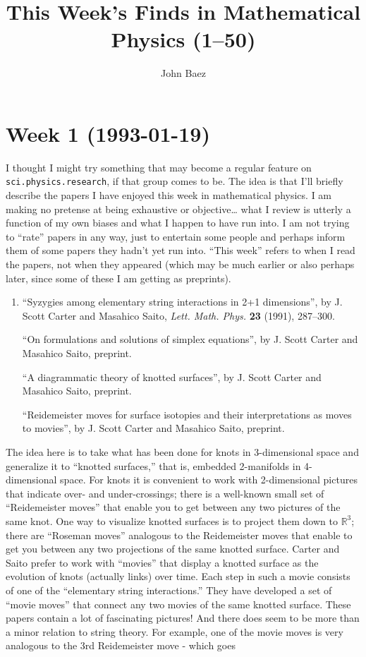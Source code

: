 \documentclass{article}
\title{This Week's Finds in Mathematical Physics (1--50)}
\author{John Baez}
\date{}
\begin{document}
\maketitle
\tableofcontents

\hypertarget{week-1-1993-01-19}{%
\section{Week 1 (1993-01-19)}\label{week-1-1993-01-19}}

I thought I might try something that may become a regular feature on
\texttt{sci.physics.research}, if that group comes to be. The idea is
that I'll briefly describe the papers I have enjoyed this week in
mathematical physics. I am making no pretense at being exhaustive or
objective\ldots{} what I review is utterly a function of my own biases
and what I happen to have run into. I am not trying to ``rate'' papers
in any way, just to entertain some people and perhaps inform them of
some papers they hadn't yet run into. ``This week'' refers to when I
read the papers, not when they appeared (which may be much earlier or
also perhaps later, since some of these I am getting as preprints).

\begin{enumerate}
\def\labelenumi{\arabic{enumi})}
\item
  ``Syzygies among elementary string interactions in 2+1 dimensions'',
  by J. Scott Carter and Masahico Saito, \emph{Lett. Math. Phys.}
  \textbf{23} (1991), 287--300.

  ``On formulations and solutions of simplex equations'', by J. Scott
  Carter and Masahico Saito, preprint.

  ``A diagrammatic theory of knotted surfaces'', by J. Scott Carter and
  Masahico Saito, preprint.

  ``Reidemeister moves for surface isotopies and their interpretations
  as moves to movies'', by J. Scott Carter and Masahico Saito, preprint.
\end{enumerate}

The idea here is to take what has been done for knots in 3-dimensional
space and generalize it to ``knotted surfaces,'' that is, embedded
2-manifolds in 4-dimensional space. For knots it is convenient to work
with 2-dimensional pictures that indicate over- and under-crossings;
there is a well-known small set of ``Reidemeister moves'' that enable
you to get between any two pictures of the same knot. One way to
visualize knotted surfaces is to project them down to \(\mathbb{R}^3\);
there are ``Roseman moves'' analogous to the Reidemeister moves that
enable to get you between any two projections of the same knotted
surface. Carter and Saito prefer to work with ``movies'' that display a
knotted surface as the evolution of knots (actually links) over time.
Each step in such a movie consists of one of the ``elementary string
interactions.'' They have developed a set of ``movie moves'' that
connect any two movies of the same knotted surface. These papers contain
a lot of fascinating pictures! And there does seem to be more than a
minor relation to string theory. For example, one of the movie moves is
very analogous to the 3rd Reidemeister move - which goes
\end{document}
